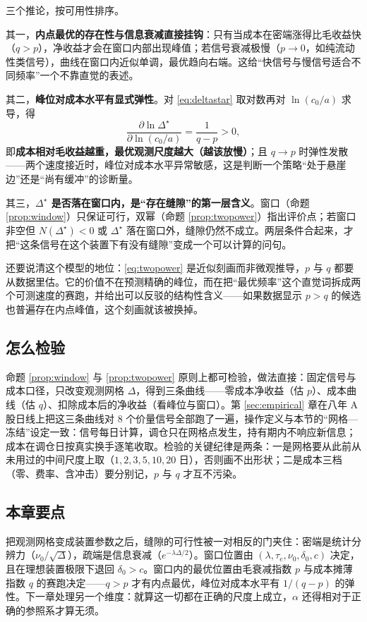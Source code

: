 三个推论，按可用性排序。

其一，\textbf{内点最优的存在性与信息衰减直接挂钩}：只有当成本在密端涨得比毛收益快（$q>p$），净收益才会在窗口内部出现峰值；若信号衰减极慢（$p\to0$，如纯流动性类信号），曲线在窗口内近似单调，最优趋向右端。这给“快信号与慢信号适合不同频率”一个不靠直觉的表述。

其二，\textbf{峰位对成本水平有显式弹性}。对 \eqref{eq:deltastar} 取对数再对 $\ln(c_0/a)$ 求导，得
\begin{equation}
  \frac{\partial\ln\Delta^\star}{\partial\ln(c_0/a)}=\frac{1}{q-p}>0,
\end{equation}
即\textbf{成本相对毛收益越重，最优观测尺度越大（越该放慢）}；且 $q\to p$ 时弹性发散——两个速度接近时，峰位对成本水平异常敏感，这是判断一个策略“处于悬崖边”还是“尚有缓冲”的诊断量。

其三，\textbf{$\Delta^\star$ 是否落在窗口内，是“存在缝隙”的第一层含义}。窗口（命题 \ref{prop:window}）只保证可行，双幂（命题 \ref{prop:twopower}）指出评价点；若窗口非空但 $N(\Delta^\star)<0$ 或 $\Delta^\star$ 落在窗口外，缝隙仍然不成立。两层条件合起来，才把“这条信号在这个装置下有没有缝隙”变成一个可以计算的问句。

还要说清这个模型的地位：\eqref{eq:twopower} 是近似刻画而非微观推导，$p$ 与 $q$ 都要从数据里估。它的价值不在预测精确的峰位，而在把“最优频率”这个直觉词拆成两个可测速度的赛跑，并给出可以反驳的结构性含义——如果数据显示 $p>q$ 的候选也普遍存在内点峰值，这个刻画就该被换掉。

\subsection{怎么检验}

命题 \ref{prop:window} 与 \ref{prop:twopower} 原则上都可检验，做法直接：固定信号与成本口径，只改变观测网格 $\Delta$，得到三条曲线——零成本净收益（估 $p$）、成本曲线（估 $q$）、扣除成本后的净收益（看峰位与窗口）。第 \ref{sec:empirical} 章在八年 A 股日线上把这三条曲线对 8 个价量信号全部跑了一遍，操作定义与本节的“网格—冻结”设定一致：信号每日计算，调仓只在网格点发生，持有期内不响应新信息；成本在调仓日按真实换手逐笔收取。检验的关键纪律是两条：一是网格要从此前从未用过的中间尺度上取（$1,2,3,5,10,20$ 日），否则画不出形状；二是成本三档（零、费率、含冲击）要分别记，$p$ 与 $q$ 才互不污染。

\subsection{本章要点}

把观测网格变成装置参数之后，缝隙的可行性被一对相反的门夹住：密端是统计分辨力（$\nu_0/\sqrt{\Delta}$），疏端是信息衰减（$e^{-\lambda\Delta/2}$）。窗口位置由 $(\lambda,\tau_e,\nu_0,\delta_0,c)$ 决定，且在理想装置极限下退回 $\delta_0>c$。窗口内的最优位置由毛衰减指数 $p$ 与成本摊薄指数 $q$ 的赛跑决定——$q>p$ 才有内点最优，峰位对成本水平有 $1/(q-p)$ 的弹性。下一章处理另一个维度：就算这一切都在正确的尺度上成立，$\alpha$ 还得相对于正确的参照系才算无须。